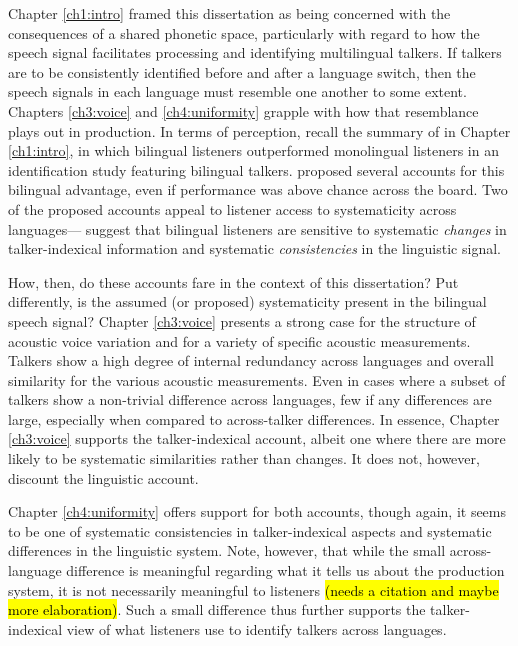 Chapter \ref{ch1:intro} framed this dissertation as being concerned with the consequences of a shared phonetic space, particularly with regard to how the speech signal facilitates processing and identifying multilingual talkers. If talkers are to be consistently identified before and after a language switch, then the speech signals in each language must resemble one another to some extent. Chapters \ref{ch3:voice} and \ref{ch4:uniformity} grapple with how that resemblance plays out in production. In terms of perception, recall the summary of \citet{orena_2019_identifying} in Chapter \ref{ch1:intro}, in which bilingual listeners outperformed monolingual listeners in an identification study featuring bilingual talkers. \citeauthor{orena_2019_identifying} proposed several accounts for this bilingual advantage, even if performance was above chance across the board. Two of the proposed accounts appeal to listener access to systematicity across languages---\citet{orena_2019_identifying} suggest that bilingual listeners are sensitive to systematic \textit{changes} in talker-indexical information and systematic \textit{consistencies} in the linguistic signal. 

How, then, do these accounts fare in the context of this dissertation? Put differently, is the assumed (or proposed) systematicity present in the bilingual speech signal? Chapter \ref{ch3:voice} presents a strong case for the structure of acoustic voice variation and for a variety of specific acoustic measurements. Talkers show a high degree of internal redundancy across languages and overall similarity for the various acoustic measurements. Even in cases where a subset of talkers show a non-trivial difference across languages, few if any differences are large, especially when compared to across-talker differences. In essence, Chapter \ref{ch3:voice} supports the talker-indexical account, albeit one where there are more likely to be systematic similarities rather than changes. It does not, however, discount the linguistic account. 

Chapter \ref{ch4:uniformity} offers support for both accounts, though again, it seems to be one of systematic consistencies in talker-indexical aspects and systematic differences in the linguistic system. Note, however, that while the small across-language difference is meaningful regarding what it tells us about the production system, it is not necessarily meaningful to listeners \hl{(needs a citation and maybe more elaboration)}. Such a small difference thus further supports the talker-indexical view of what listeners use to identify talkers across languages.

